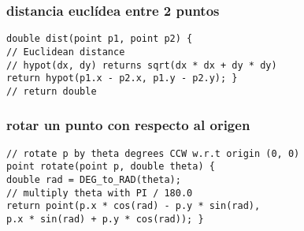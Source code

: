 \subsubsection{distancia euclídea entre 2 puntos}
\begin{lstlisting}[style=C]
double dist(point p1, point p2) {
// Euclidean distance
// hypot(dx, dy) returns sqrt(dx * dx + dy * dy)
return hypot(p1.x - p2.x, p1.y - p2.y); }
// return double
\end{lstlisting}
\subsubsection{rotar un punto con respecto al origen}
\begin{lstlisting}[style=C]
// rotate p by theta degrees CCW w.r.t origin (0, 0)
point rotate(point p, double theta) {
double rad = DEG_to_RAD(theta);
// multiply theta with PI / 180.0
return point(p.x * cos(rad) - p.y * sin(rad),
p.x * sin(rad) + p.y * cos(rad)); }
\end{lstlisting}
